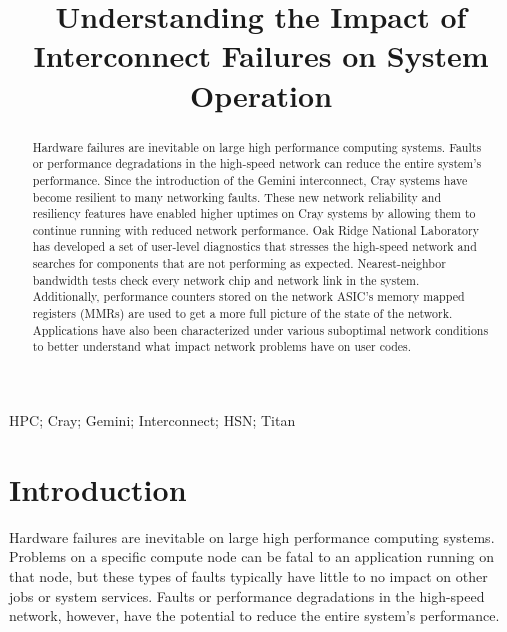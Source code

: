 \documentclass[10pt, conference, compsocconf]{IEEEtran}
\begin{document}
\title{Understanding the Impact of Interconnect Failures on System Operation}

\author{
}

\maketitle

\begin{abstract}
Hardware failures are inevitable on large high performance computing systems.
Faults or performance degradations in the high-speed network can reduce the
entire system’s performance. Since the introduction of the Gemini interconnect,
Cray systems have become resilient to many networking faults. These new network
reliability and resiliency features have enabled higher uptimes on Cray systems
by allowing them to continue running with reduced network performance. Oak
Ridge National Laboratory has developed a set of user-level diagnostics that
stresses the high-speed network and searches for components that are not
performing as expected. Nearest-neighbor bandwidth tests check every network
chip and network link in the system. Additionally, performance counters stored
on the network ASIC’s memory mapped registers (MMRs) are used to get a more
full picture of the state of the network. Applications have also been
characterized under various suboptimal network conditions to better understand
what impact network problems have on user codes.
\end{abstract}

\begin{IEEEkeywords}
HPC; Cray; Gemini; Interconnect; HSN; Titan
\end{IEEEkeywords}

\section{Introduction} 

Hardware failures are inevitable on large high performance computing systems.
Problems on a specific compute node can be fatal to an application running on
that node, but these types of faults typically have little to no impact on
other jobs or system services. Faults or performance degradations in the
high-speed network, however, have the potential to reduce the entire system’s
performance.
\end{document}
